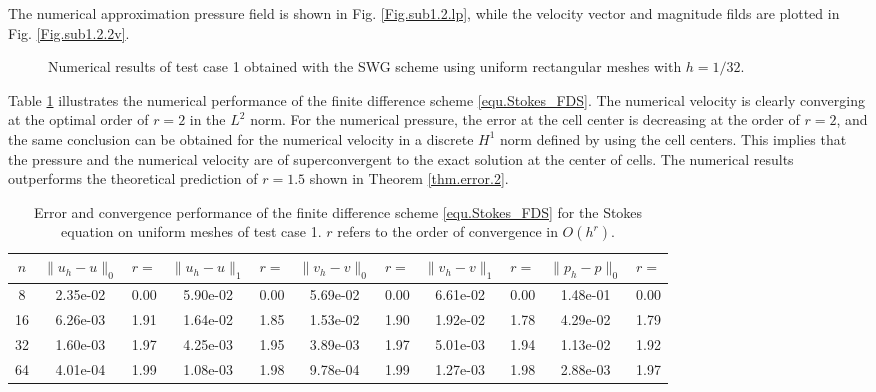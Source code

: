 \documentclass[final,leqno]{siamltex704}
\begin{document}
The numerical approximation pressure field is shown in Fig. \ref{Fig.sub1.2.lp}, while the velocity vector and magnitude filds are plotted in Fig. \ref{Fig.sub1.2.2v}.
\begin{figure}[H]
\centering
{}

\caption{Numerical results of test case 1 obtained with the SWG scheme using uniform rectangular meshes with $h=1/32$.}
\label{fig:testcase1}
\end{figure}

Table \ref{table4} illustrates the numerical performance of the finite difference scheme \eqref{equ.Stokes_FDS}. The numerical velocity is clearly converging at the optimal order of $r=2$ in the $L^2$ norm. For the numerical pressure, the error at the cell center is decreasing at the order of $r=2$, and the same conclusion can be obtained for the numerical velocity in a discrete $H^1$ norm defined by using the cell centers. This implies that the pressure and the numerical velocity are of  superconvergent to the exact solution at the center of cells. The numerical results outperforms the theoretical prediction of $r=1.5$ shown in Theorem \ref{thm.error.2}.

{\small
\begin{table}[h]
\begin{center}
\caption{Error and convergence performance of the finite difference scheme \eqref{equ.Stokes_FDS} for the Stokes equation on uniform meshes of test case 1. $r$ refers to the order of convergence in $O(h^r)$.}\label{table4}
{\tiny\begin{tabular}{||c|cc|cc|cc|cc|cc||}
\hline
$n$ & $\|u_h-u \|_{0}$ & $r=$ & $\|u_h-u\|_{1}$ & $r=$ &$\|v_h-v \|_{0}$& $r=$ &$\|v_h-v\|_{1}$ & $r=$ &$\|p_h-p \|_{0}$& $r=$ \\
\hline
8     & 2.35e-02  &  0.00   &   5.90e-02  &  0.00  &    5.69e-02 &   0.00  &    6.61e-02  &  0.00   &   1.48e-01 &   0.00\\
16    & 6.26e-03  &  1.91   &   1.64e-02  &  1.85  &    1.53e-02 &   1.90  &    1.92e-02  &  1.78   &   4.29e-02 &   1.79\\
32    & 1.60e-03  &  1.97   &   4.25e-03  &  1.95  &    3.89e-03 &   1.97  &    5.01e-03  &  1.94   &   1.13e-02 &   1.92\\
64    & 4.01e-04  &  1.99   &   1.08e-03  &  1.98  &    9.78e-04 &   1.99  &    1.27e-03  &  1.98   &   2.88e-03 &   1.97\\
\hline
\end{tabular}}
\end{center}
\end{table}
}
\end{document}
